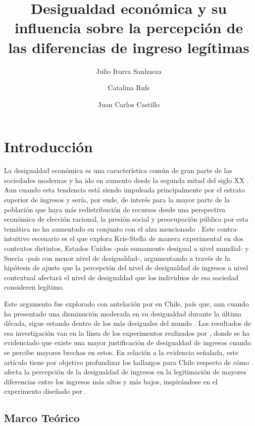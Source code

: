 \documentclass[12pt]{article}
\title{\textbf{Desigualdad económica y su influencia sobre la percepción de las diferencias de ingreso legítimas}}
\author{Julio Iturra Sanhueza \and Catalina Rufs \and Juan Carlos Castillo}
\date{}
\begin{document}
	
\maketitle

\section*{Introducción}

La desigualdad económica es una característica común de gran parte de las sociedades modernas y ha ido en aumento desde la segunda mitad del siglo XX \citep{Esping_Andersen2007}. Aun cuando esta tendencia está siendo impulsada principalmente por el estrato superior de ingresos y sería, por ende, de interés para la mayor parte de la población que haya más redistribución de recursos desde una perspectiva económica de elección racional, la presión social y preocupación pública por esta temática no ha aumentado en conjunto con el alza mencionado \citep{Trump2017}. Este contra-intuitivo escenario es el que explora Kris-Stella \cite{Trump2017} de manera experimental en dos contextos distintos, Estados Unidos -país sumamente desigual a nivel mundial- y Suecia -país con menor nivel de desigualdad-, argumentando a través de la hipótesis de ajuste que la percepción del nivel de desigualdad de ingresos a nivel contextual afectará el nivel de desigualdad que los individuos de esa sociedad consideren legítimo. 

Este argumento fue explorado con antelación por \cite{Castillo2011} en Chile, país que, aun cuando ha presentado una disminución moderada en su desigualdad  durante la última década, sigue estando dentro de los más desiguales del mundo \citep{PNUD2015,WDI2018}. Los resultados de esa investigación van en la línea de los experimentos realizados por \cite{Trump2017}, donde se ha evidenciado que existe una mayor justificación de desigualdad de ingresos cuando se percibe mayores brechas en estos. En relación a la evidencia señalada, este artículo tiene por objetivo profundizar los hallazgos para Chile respecto de cómo afecta la percepción de la desigualdad de ingresos en la legitimación de mayores diferencias entre los ingresos más altos y más bajos, inspirándose en el experimento diseñado por \cite{Trump2017}.

\subsection*{Marco Teórico}
\end{document}
